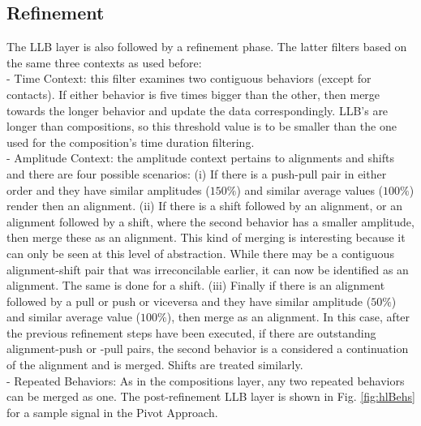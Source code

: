 \subsection{Refinement} \label{subsubsec:Refinement2}
The LLB layer is also followed by a refinement phase. The latter filters based on the same three contexts as used before:\\
- Time Context: this filter examines two contiguous behaviors (except for contacts). If either behavior is five times bigger than the other, then merge towards the longer behavior and update the data correspondingly. LLB's are longer than compositions, so this threshold value is to be smaller than the one used for the composition's time duration filtering. \\
- Amplitude Context: the amplitude context pertains to alignments and shifts and there are four possible scenarios: (i) If there is a push-pull pair in either order and they have similar amplitudes ($150\%$) and similar average values ($100\%$) render then an alignment. (ii) If there is a shift followed by an alignment, or an alignment followed by a shift, where the second behavior has a smaller amplitude, then merge these as an alignment. This kind of merging is interesting because it can only be seen at this level of abstraction. While there may be a contiguous alignment-shift pair that was irreconcilable earlier, it can now be identified as an alignment. The same is done for a shift. (iii) Finally if there is an alignment followed by a pull or push or viceversa and they have similar amplitude ($50\%$) and similar average value ($100\%$), then merge as an alignment. In this case, after the previous refinement steps have been executed, if there are outstanding alignment-push or -pull pairs, the second behavior is a considered a continuation of the alignment and is merged. Shifts are treated similarly.\\
- Repeated Behaviors: As in the compositions layer, any two repeated behaviors can be merged as one.
The post-refinement LLB layer is shown in Fig. \ref{fig:hlBehs} for a sample signal in the Pivot Approach.
